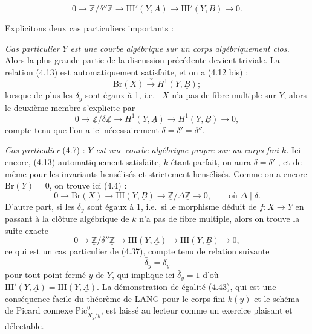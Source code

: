 \documentclass[11pt,a4paper]{article}
\begin{document}

\[
0 \to \underline{\mathbb{Z}}/\delta''\underline{\mathbb{Z}} \to
\mathrm{III}'(Y,\underline{A}) \to \mathrm{III}'(Y,\underline{B}) \to 0 .
\tag{4.38}
\]

Explicitons deux cas particuliers importants :

\emph{Cas particulier}   \emph{$Y$ est une courbe
algébrique sur un corps algébriquement clos.} Alors la  plus grande partie de la discussion précédente
devient triviale. La relation (4.13) est automatiquement satisfaite, et on a
(4.12 bis) :
\[
\mathrm{Br}(X) \xrightarrow{\ \sim\ } H^{1}(Y,\underline{B}) ;
\tag{4.39}
\]
lorsque de plus les $\delta_{y}$ sont égaux à 1, i.e.\  $X$ n'a pas
de fibre multiple sur $Y$, alors le deuxième membre s'explicite
 par
\[
0 \to \underline{\mathbb{Z}}/\delta\underline{\mathbb{Z}} \to
H^{1}(Y,\underline{A}) \to H^{1}(Y,\underline{B}) \to 0 ,
\tag{4.40}
\]
compte tenu que  l'on a ici nécessairement $\delta = \delta' =
\delta''$.

\emph{Cas particulier} (4.7) : \emph{$Y$ est une courbe algébrique propre sur
un corps fini $k$.} Ici encore, (4.13)  \add{\struck{\ill{}}}
automatiquement satisfaite, $k$ étant parfait,   on aura $\delta = \delta'$ \struck{\ill{}}, et de
même pour les invariants hensélisés et strictement hensélisés. Comme on a
encore $\mathrm{Br}(Y) = 0$, on trouve ici (4.4) :
\[
0 \to \mathrm{Br}(X) \to \mathrm{III}(Y,\underline{B}) \to
\underline{\mathbb{Z}}/\Delta\underline{\mathbb{Z}} \to 0 ,
\qquad \text{où } \Delta \mid \delta .
\tag{4.41}
\]
\struck{\ill{}} D'autre part, si les $\delta_{y}$ sont égaux à 1, i.e.\ si
le morphisme déduit de $f : X \to Y$ en passant à la clôture algébrique de
$k$ n'a pas de fibre multiple, alors on trouve la suite exacte
\[
0 \to \underline{\mathbb{Z}}/\delta''\underline{\mathbb{Z}} \to
\mathrm{III}(Y,\underline{A}) \to \mathrm{III}(Y,\underline{B}) \to 0 ,
\tag{4.42}
\]
ce qui est un cas particulier de (4.37), compte tenu de 
relation suivante
\[
\bar{\delta}_{y} = \delta_{y}
\tag{4.43}
\]
pour tout point fermé $y$ de $Y$, qui implique ici $\bar{\delta}_{y} = 1$
d'où $\mathrm{III}'(Y,\underline{A}) = \mathrm{III}(Y,\underline{A})$. La
démonstration de  égalité (4.43), qui est une
conséquence facile du théorème de LANG 
pour le corps fini $k(y)$ et le schéma de Picard connexe
 $\underline{\mathrm{Pic}}^{0}_{X_{y}/y}$, est laissé
au lecteur comme un exercice plaisant et délectable.
\end{document}
